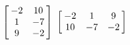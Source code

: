 {$\left[\hskip -3pt \begin{array}{cc} -2&10\\  1&-7
\\  9&-2\end{array}\hskip -3pt \right] $}
{$\left[\hskip -3pt \begin{array}{ccc} -2&1&9\\  10&-7&-2
\end{array}\hskip -3pt \right]$}

